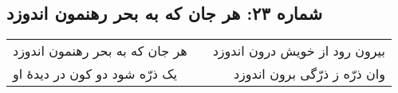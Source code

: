 \begin{center}
\section*{شماره ۲۳: هر جان که به بحر رهنمون اندوزد}
\label{sec:023}
\begin{longtable}{l p{0.5cm} r}
هر جان که به بحر رهنمون اندوزد
&&
بیرون رود از خویش درون اندوزد
\\
یک ذرّه شود دو کون در دیدهٔ او
&&
وان ذرّه ز ذرّگی برون اندوزد
\\
\end{longtable}
\end{center}
